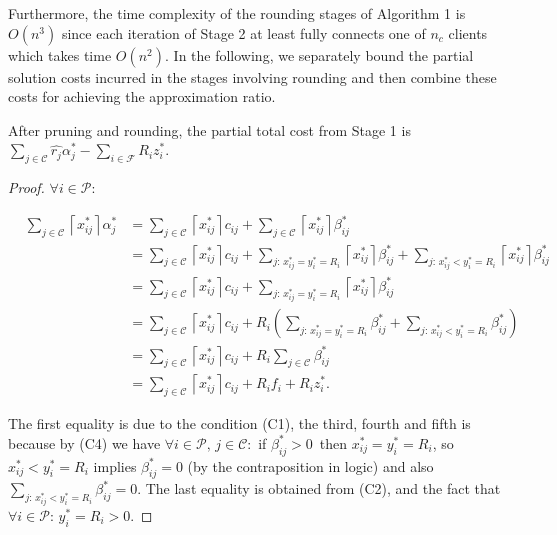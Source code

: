 \documentclass[10pt]{llncs}
\begin{document}
Furthermore, the time complexity of the rounding stages of Algorithm
1 is $O\left(n^{3}\right)$ since each iteration of Stage 2 at least
fully connects one of $n_{c}$ clients which takes time $O\left(n^{2}\right)$.
In the following, we separately bound the partial solution costs incurred
in the stages involving rounding and then combine these costs for
achieving the approximation ratio.
\begin{lemma}
After pruning and rounding, the partial total cost from Stage 1 is
$\sum_{j\in\mathcal{C}}\hat{r_{j}}\alpha_{j}^{*}-\sum_{i\in\mathcal{F}}R_{i}z_{i}^{*}$.
\label{lem:1}\end{lemma}
\begin{proof}
$\forall i\in\mathcal{P}:\,$

\begin{eqnarray*}
 & \sum_{j\in\mathcal{C}}\left\lceil x_{ij}^{*}\right\rceil \alpha_{j}^{*} & =\sum_{j\in\mathcal{C}}\left\lceil x_{ij}^{*}\right\rceil c_{ij}+\sum_{j\in\mathcal{C}}\left\lceil x_{ij}^{*}\right\rceil \beta_{ij}^{*}\\
 &  & =\sum_{j\in\mathcal{C}}\left\lceil x_{ij}^{*}\right\rceil c_{ij}+\sum_{j:\, x_{ij}^{*}=y_{i}^{*}=R_{i}}\left\lceil x_{ij}^{*}\right\rceil \beta_{ij}^{*}+\sum_{j:\, x_{ij}^{*}<y_{i}^{*}=R_{i}}\left\lceil x_{ij}^{*}\right\rceil \beta_{ij}^{*}\\
 &  & =\sum_{j\in\mathcal{C}}\left\lceil x_{ij}^{*}\right\rceil c_{ij}+\sum_{j:\, x_{ij}^{*}=y_{i}^{*}=R_{i}}\left\lceil x_{ij}^{*}\right\rceil \beta_{ij}^{*}\\
 &  & =\sum_{j\in\mathcal{C}}\left\lceil x_{ij}^{*}\right\rceil c_{ij}+R_{i}\left(\sum_{j:\, x_{ij}^{*}=y_{i}^{*}=R_{i}}\beta_{ij}^{*}+\sum_{j:\, x_{ij}^{*}<y_{i}^{*}=R_{i}}\beta_{ij}^{*}\right)\\
 &  & =\sum_{j\in\mathcal{C}}\left\lceil x_{ij}^{*}\right\rceil c_{ij}+R_{i}\sum_{j\in\mathcal{C}}\beta_{ij}^{*}\\
 &  & =\sum_{j\in\mathcal{C}}\left\lceil x_{ij}^{*}\right\rceil c_{ij}+R_{i}f_{i}+R_{i}z_{i}^{*}.
\end{eqnarray*}


The first equality is due to the condition (C1), the third, fourth
and fifth is because by (C4) we have $\forall i\in\mathcal{P},\, j\in\mathcal{C}:$
if $\beta_{ij}^{*}>0\,$ then $x_{ij}^{*}=y_{i}^{*}=R_{i}$, so $x_{ij}^{*}<y_{i}^{*}=R_{i}$
implies $\beta_{ij}^{*}=0$ (by the contraposition in logic) and also
$\sum_{j:\, x_{ij}^{*}<y_{i}^{*}=R_{i}}\beta_{ij}^{*}=0$. The last
equality is obtained from (C2), and the fact that $\forall i\in\mathcal{P}:\, y_{i}^{*}=R_{i}>0$.


\end{proof}
\end{document}
